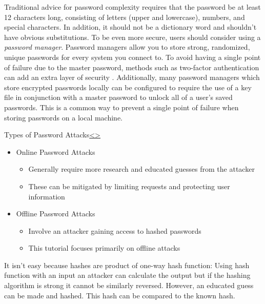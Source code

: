 \documentclass[12pt]{article}
\newenvironment{instructionblock}{\Large\bgroup}{\egroup}
\begin{document}
Traditional advice for password complexity requires that the password be at least 12 characters long, consisting of letters (upper and lowercase), numbers, and special characters. In addition, it should not be a dictionary word and shouldn't have obvious substitutions. To be even more secure, users should consider using a \textit{password manager}. Password managers allow you to store strong, randomized, unique passwords for every system you connect to. \cite{strongpass} To avoid having a single point of failure due to the master password, methods such as two-factor authentication can add an extra layer of security \cite{passmanager}. Additionally, many password managers which store encrypted passwords locally can be configured to require the use of a key file in conjunction with a master password to unlock all of a user's saved passwords. This is a common way to prevent a single point of failure when storing passwords on a local machine.

\pagebreak

\begin{slide}{Types of Password Attacks}{\hyperref[slide 7]{\textless}\hyperref[slide 9]{\textgreater}}
		\vskip 10pt
	\begin{instructionblock}
		\begin{itemize}
			\item Online Password Attacks
			\begin{itemize}
				\item Generally require more research and educated guesses from the attacker
				\item These can be mitigated by limiting requests and protecting user information
			\end{itemize}
			\item Offline Password Attacks
			\begin{itemize}
				\item Involve an attacker gaining access to hashed passwords
				\item This tutorial focuses primarily on offline attacks
			\end{itemize}
		\end{itemize}
	\end{instructionblock}
\end{slide}


\vfill

It isn’t easy because hashes are product of one-way hash function: Using hash function with an input an attacker can calculate the output but if the hashing algorithm is strong it cannot be similarly reversed.
However, an educated guess can be made and hashed. This hash can be compared to the known hash.
\end{document}
